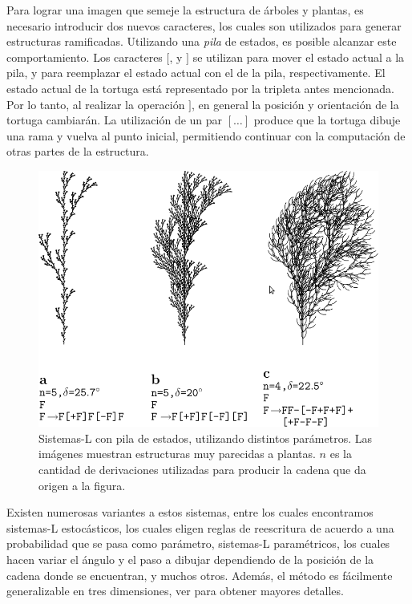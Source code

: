 Para lograr una imagen que semeje la estructura de árboles y plantas, es necesario introducir dos nuevos caracteres, los cuales son utilizados para generar estructuras ramificadas.
Utilizando una {\em pila} de estados, es posible alcanzar este comportamiento.
Los caracteres $[$, y $]$ se utilizan para mover el estado actual a la pila, y para reemplazar el estado actual con el de la pila, respectivamente.
El estado actual de la tortuga está representado por la tripleta antes mencionada.
Por lo tanto, al realizar la operación $]$, en general la posición y orientación de la tortuga cambiarán.
La utilización de un par $[\dots]$ produce que la tortuga dibuje una rama y vuelva al punto inicial, permitiendo continuar con la computación de otras partes de la estructura.

\begin{figure}
\center
\includegraphics[width=13cm]{figures/sistemalcorchete}
\caption[Sistemas-L con pila de estados, utilizando distintos parámetros]{Sistemas-L con pila de estados, utilizando distintos parámetros. Las imágenes muestran estructuras muy parecidas a plantas. $n$ es la cantidad de derivaciones utilizadas para producir la cadena que da origen a la figura.}
\label{fg:sistemasLcorchete}
\end{figure}


Existen numerosas variantes a estos sistemas, entre los cuales encontramos sistemas-L estocásticos, los cuales eligen reglas de reescritura de acuerdo a una probabilidad que se pasa como parámetro, sistemas-L paramétricos, los cuales hacen variar el ángulo y el paso a dibujar dependiendo de la posición de la cadena donde se encuentran, y muchos otros.
Además, el método es fácilmente generalizable en tres dimensiones, ver \cite{Prusinkiewicz1990} para obtener mayores detalles.

